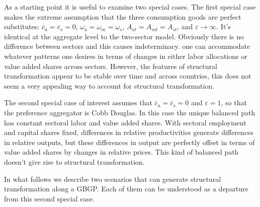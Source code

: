 \documentclass{article}
\begin{document}
    As a starting point it is useful to examine two special cases. The first special case makes the extreme assumption that the three consumption goods are perfect substitutes: $\bar{c}_a=\bar{c}_s=0$, $\omega_a=\omega_m=\omega_s$, $A_{at}=A_{mt}=A_{st}$, and $\varepsilon \rightarrow \infty$. It's identical at the aggregate level to the two-sector model. Obviously there is no difference between sectors and this causes indeterminacy. one can accommodate whatever patterns one desires in terms of changes in either labor allocations or value added shares across sectors. However, the features of structural transformation appear to be stable over time and across countries, this does not seem a very appealing way to account for structural transformation.

    The second special case of interest assumes that $\bar{c}_a = \bar{c}_s = 0$ and $\varepsilon = 1$, so that the preference aggregator is Cobb Douglas. In this case the unique balanced path has constant sectoral labor and value added shares. With sectoral employment and capital shares fixed, differences in relative productivities generate differences in relative outputs, but these differences in output are perfectly offset in terms of value added shares by changes in relative prices. This kind of balanced path doesn't give rise to structural transformation.

    In what follows we describe two scenarios that can generate structural transformation along a GBGP. Each of them can be understood as a departure from this second special case.
\end{document}
